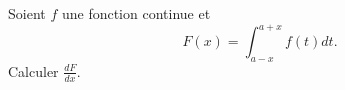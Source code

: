 

\begin{exercice}\label{exo_I-3-1}

Soient $f$ une fonction continue et
\begin{equation}
	F(x)=\int_{a-x}^{a+x}f(t)dt.
\end{equation}
Calculer $\frac{ dF }{ dx }$.

\end{exercice}
